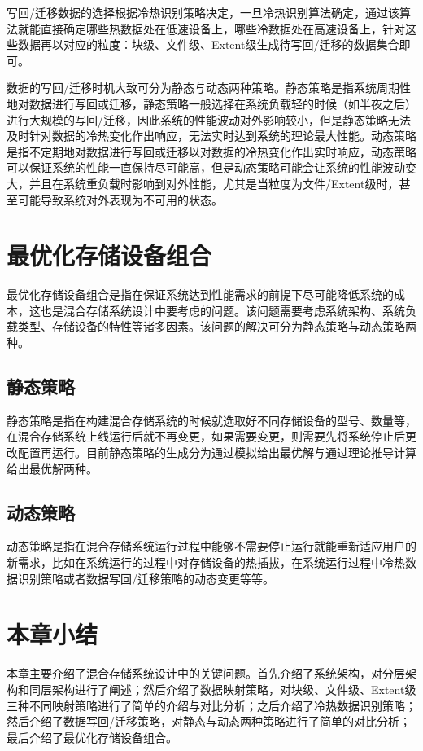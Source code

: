 写回/迁移数据的选择根据冷热识别策略决定，一旦冷热识别算法确定，通过该算法就能直接确定哪些热数据处在低速设备上，哪些冷数据处在高速设备上，针对这些数据再以对应的粒度：块级、文件级、Extent级生成待写回/迁移的数据集合即可。

数据的写回/迁移时机大致可分为静态与动态两种策略。静态策略是指系统周期性地对数据进行写回或迁移，静态策略一般选择在系统负载轻的时候（如半夜之后）进行大规模的写回/迁移，因此系统的性能波动对外影响较小，但是静态策略无法及时针对数据的冷热变化作出响应，无法实时达到系统的理论最大性能。动态策略是指不定期地对数据进行写回或迁移以对数据的冷热变化作出实时响应，动态策略可以保证系统的性能一直保持尽可能高，但是动态策略可能会让系统的性能波动变大，并且在系统重负载时影响到对外性能，尤其是当粒度为文件/Extent级时，甚至可能导致系统对外表现为不可用的状态。

\section{最优化存储设备组合}

最优化存储设备组合是指在保证系统达到性能需求的前提下尽可能降低系统的成本，这也是混合存储系统设计中要考虑的问题。该问题需要考虑系统架构、系统负载类型、存储设备的特性等诸多因素。该问题的解决可分为静态策略与动态策略两种。

\subsection{静态策略}

静态策略是指在构建混合存储系统的时候就选取好不同存储设备的型号、数量等，在混合存储系统上线运行后就不再变更，如果需要变更，则需要先将系统停止后更改配置再运行。目前静态策略的生成分为通过模拟\cite{guerra2011cost}给出最优解与通过理论推导计算\cite{kim2011hybridstore}给出最优解两种。

\subsection{动态策略}

动态策略是指在混合存储系统运行过程中能够不需要停止运行就能重新适应用户的新需求，比如在系统运行的过程中对存储设备的热插拔，在系统运行过程中冷热数据识别策略或者数据写回/迁移策略的动态变更等等。

\section{本章小结}

本章主要介绍了混合存储系统设计中的关键问题。首先介绍了系统架构，对分层架构和同层架构进行了阐述；然后介绍了数据映射策略，对块级、文件级、Extent级三种不同映射策略进行了简单的介绍与对比分析；之后介绍了冷热数据识别策略；然后介绍了数据写回/迁移策略，对静态与动态两种策略进行了简单的对比分析；最后介绍了最优化存储设备组合。